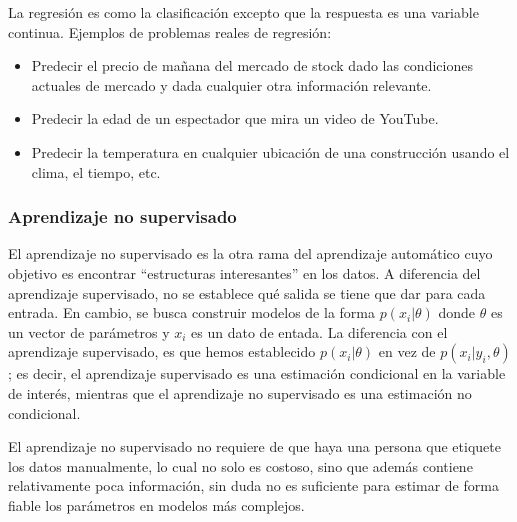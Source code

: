 	
		La regresión es como la clasificación excepto que la respuesta es una variable continua. Ejemplos de problemas reales de regresión:
		\begin{itemize}
			\item Predecir el precio de mañana del mercado de stock dado las condiciones actuales de mercado y dada cualquier otra información relevante.
			\item Predecir la edad de un espectador que mira un video de YouTube.
			\item Predecir la temperatura en cualquier ubicación de una construcción usando el clima, el tiempo, etc.
		\end{itemize}
	
	
	\subsubsection{Aprendizaje no supervisado}
	
		
		El aprendizaje no supervisado es la otra rama del aprendizaje automático cuyo objetivo es encontrar ``estructuras interesantes'' en los datos. A diferencia del aprendizaje supervisado, no se establece qué salida se tiene que dar para cada entrada. En cambio, se busca construir modelos de la forma $p(x_i | \theta)$ donde $\theta$ es un vector de parámetros y $x_i$ es un dato de entada. La diferencia con el aprendizaje supervisado, es que hemos establecido $p(x_i | \theta)$ en vez de $p(x_i | y_i, \theta)$; es decir, el aprendizaje supervisado es una estimación condicional en la variable de interés, mientras que el aprendizaje no supervisado es una estimación no condicional.
		
		El aprendizaje no supervisado no requiere de que haya una persona que etiquete los datos manualmente, lo cual no solo es costoso, sino que además contiene relativamente poca información, sin duda no es suficiente para estimar de forma fiable los parámetros en modelos más complejos.